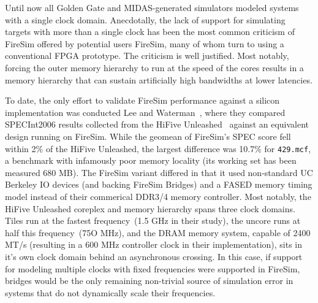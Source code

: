 
Until now all Golden Gate and MIDAS-generated simulators modeled systems with a
single clock domain. Anecdotally, the lack of support for simulating targets
with more than a single clock has been the most common criticism of FireSim
offered by potential users FireSim, many of whom turn to using a conventional
FPGA prototype. The criticism is well justified. Most notably, forcing the outer memory
hierarchy to run at the speed of the cores results in a memory hierarchy that
can sustain artificially high bandwidths at lower latencies.

To date, the only effort to validate FireSim performance against a silicon
implementation was conducted Lee and Waterman~\cite{VLSIFireSimEval}, where they
compared SPECInt2006 results collected from the HiFive Unleashed~\cite{HiFiveUnleashed}
against an equivalent design running on FireSim. While the geomean of FireSim's
SPEC score fell within 2\% of the HiFive Unleashed, the largest difference was
10.7\% for \texttt{429.mcf}, a benchmark with infamously poor memory locality
(its working set has been measured 680 MB\cite{SPEC2006WorkingSet}). The
FireSim variant differed in that it used non-standard UC Berkeley IO devices
(and backing FireSim Bridges) and a FASED memory timing model instead of their
commerical DDR3/4 memory controller. Most notably, the HiFive Unleashed
coreplex and memory hierarchy spans three clock domains. Tiles run at the fastest
frequency~(1.5 GHz in their study), the uncore runs at half this frequency~(75O
MHz), and the DRAM memory system, capable of 2400 MT/s (resulting in a 600 MHz
controller clock in their implementation), sits in it's own clock domain behind
an asynchronous crossing\cite{FreedomU540}. In this case, if support for modeling
multiple clocks with fixed frequencies were supported in FireSim, bridges would
be the only remaining non-trivial source of simulation error in systems that do not
dynamically scale their frequencies.

